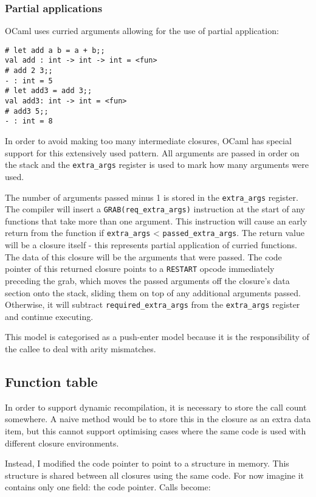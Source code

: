 \subsubsection{Partial applications}

OCaml uses curried arguments allowing for the use of partial application:

\begin{verbatim}
# let add a b = a + b;;
val add : int -> int -> int = <fun>
# add 2 3;;
- : int = 5
# let add3 = add 3;;
val add3: int -> int = <fun>
# add3 5;;
- : int = 8
\end{verbatim}

In order to avoid making too many intermediate closures, OCaml has special support for this
extensively used pattern. All arguments are passed in order on the stack and the
\texttt{extra\_args}
register is used to mark how many arguments were used.

The number of arguments passed minus 1 is stored in the \texttt{extra\_args} register. The compiler
will insert a \texttt{GRAB(req\_extra\_args)} instruction at the start of any functions that take
more than one argument.  This instruction will cause an early return from the function if
\texttt{extra\_args} <
\texttt{passed\_extra\_args}. The return value will be a closure itself - this represents partial
application of curried functions. The data of this closure will be the arguments that were passed.
The code pointer of this returned closure points to a \texttt{RESTART} opcode immediately
preceding the grab, which moves the passed arguments off  the closure's data section onto the
stack, sliding them on top of any additional arguments passed.	Otherwise, it will subtract
\texttt{required\_extra\_args} from the \texttt{extra\_args} register
and continue executing.

This model is categorised as a push-enter model because it is the responsibility of the callee to
deal with arity mismatches.

\subsection{Function table}

In order to support dynamic recompilation, it is necessary to store the call count somewhere. A
naive method would be to store this in the closure as an extra data item, but this cannot support
optimising cases where the same code is used with different closure environments.

Instead, I modified the code pointer to point to a structure in memory. This structure is shared
between all closures using the same code. For now imagine it contains only one field: the code
pointer. Calls become:

